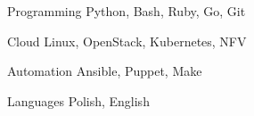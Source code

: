 

\begin{cvskills}

  \cvskill
    {Programming} %
    {Python, Bash, Ruby, Go, Git} %

  \cvskill
    {Cloud} %
    {Linux, OpenStack, Kubernetes, NFV} %

  \cvskill
    {Automation} %
    {Ansible, Puppet, Make} %

  \cvskill
    {Languages} %
    {Polish, English} %

\end{cvskills}
